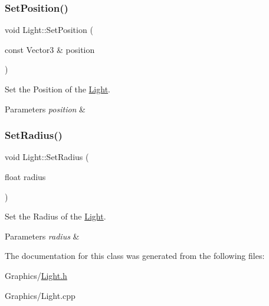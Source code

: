 \subsubsection{\texorpdfstring{Set\+Position()}{SetPosition()}}
{\footnotesize\ttfamily void Light\+::\+Set\+Position (\begin{DoxyParamCaption}\item[{const Vector3 \&}]{position }\end{DoxyParamCaption})\hspace{0.3cm}{\ttfamily [inline]}}



Set the Position of the \hyperlink{classLight}{Light}. 


\begin{DoxyParams}{Parameters}
{\em position} & \\
\hline
\end{DoxyParams}
\mbox{\label{classLight_a304fff5378538a07af88b77a0fee81fe}} 
\subsubsection{\texorpdfstring{Set\+Radius()}{SetRadius()}}
{\footnotesize\ttfamily void Light\+::\+Set\+Radius (\begin{DoxyParamCaption}\item[{float}]{radius }\end{DoxyParamCaption})\hspace{0.3cm}{\ttfamily [inline]}}



Set the Radius of the \hyperlink{classLight}{Light}. 


\begin{DoxyParams}{Parameters}
{\em radius} & \\
\hline
\end{DoxyParams}


The documentation for this class was generated from the following files\+:\begin{DoxyCompactItemize}
\item 
Graphics/\hyperlink{Light_8h}{Light.\+h}\item 
Graphics/Light.\+cpp\end{DoxyCompactItemize}
